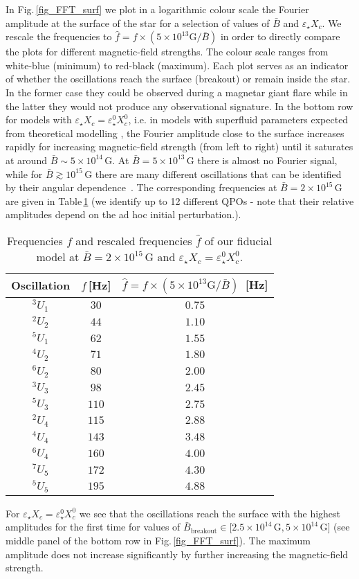 \documentclass[useAMS,usenatbib]{mnras}
\begin{document}
In Fig.\,\ref{fig_FFT_surf} we plot in a logarithmic colour scale the Fourier amplitude at the surface of the star for a 
selection of values of $\bar B$ and $\varepsilon_\star X_c$. We rescale the 
frequencies to $\hat f=
f\times(5\times10^{13}\mathrm{G} / \bar B)$ in order to directly compare the plots for different magnetic-field strengths. The colour scale ranges from white-blue (minimum) to red-black (maximum). Each plot serves as an indicator
of whether the oscillations reach the surface (breakout) or remain inside the 
star. In the former case they could be observed
during a magnetar giant flare while in the latter they would not produce any 
observational signature. In the bottom row for models with $\varepsilon_\star
X_c=\varepsilon_\star^0 X_c^0$, i.e. in models with superfluid parameters 
expected from theoretical modelling \citep{Douchin2001},  the Fourier amplitude 
close to the 
surface increases rapidly for increasing magnetic-field strength (from left to 
right) until it saturates at around $\bar 
B\sim5\times10^{14}\,$G. At $\bar B=5\times10^{13}\,$G there is almost no Fourier signal, while for $\bar B\gtrsim10^{15}\,$G there are many different oscillations that can be identified by their angular dependence~\citep[see also 
figures 5 and 6 in][]{Gabler2016}. The corresponding frequencies at $\bar 
B=2\times10^{15}\,$G are given in Table\,\ref{tab_f_2_15} (we identify up to 
12 different QPOs - note that their relative amplitudes depend on the ad hoc 
initial perturbation.).
%
\begin{table}
\centering
\begin{tabular}{c | c c }
 Oscillation&$f\,$[Hz] &$\hat f = f\times(5\times10^{13}\mathrm{G}/\bar B)\,$ 
[Hz] \\
\hline 
$^3U_1$&$30$ &$0.75$\\
$^2U_2$&$44$ & $1.10$\\
$^5U_1$&$62$ & $1.55$\\ 
$^4U_2$&$71$ &$1.80$\\
$^6U_2$&$80$ &$2.00$\\
$^3U_3$&$98$ &$2.45$\\
$^5U_3$&$110$ &$2.75$\\
$^2U_4$&$115$ &$2.88$\\
$^4U_4$&$143$ &$3.48$\\
$^6U_4$&$160$ &$4.00$\\
$^7U_5$&$172$ &$4.30$\\
$^5U_5$&$195$ &$4.88$
\end{tabular}
\caption{Frequencies $f$ and rescaled frequencies $\hat f$ of our fiducial model at $\bar 
B=2\times10^{15}\,$G and $\varepsilon_\star X_c=\varepsilon_\star^0 X_c^0$.}
\label{tab_f_2_15}
\end{table}
%
For $\varepsilon_\star X_c=\varepsilon_\star^0 X_c^0$ we see that the 
oscillations reach 
the surface with the highest amplitudes for the first time for values of
$\bar B_\mathrm{breakout} 
  \in [2.5\times10^{14}\,$G$,5\times10^{14}\,$G$]$ (see middle panel of the 
bottom row in Fig.\,\ref{fig_FFT_surf}). The maximum amplitude does not increase 
significantly by further increasing the magnetic-field strength.
\end{document}
